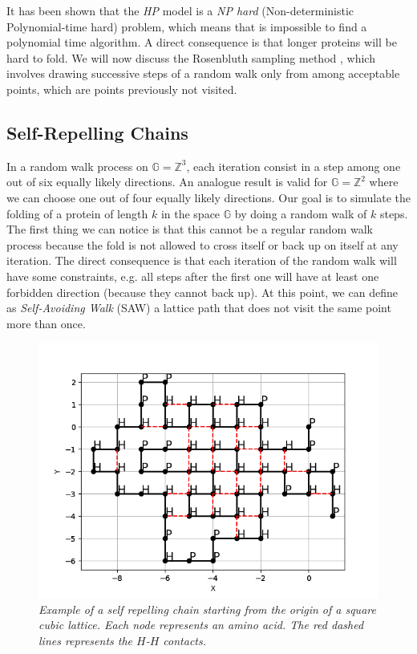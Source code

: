 It has been shown that the \emph{HP} model is a \emph{NP hard} (Non-deterministic Polynomial-time hard) problem, which means that is impossible to find a polynomial time algorithm.
A direct consequence is that longer proteins will be hard to fold.
We will now discuss the Rosenbluth sampling method \cite{PERM}, which involves drawing successive steps of a random walk only from among acceptable points, which are points previously not visited.

\subsection{Self-Repelling Chains}
In a random walk process on $\mathbb{G} = \mathbb{Z}^3$, each iteration consist in a step among one out of six equally likely directions.
An analogue result is valid for $\mathbb{G} = \mathbb{Z}^2$ where we can choose one out of four equally likely directions.
Our goal is to simulate the folding of a protein of length $k$ in the space $\mathbb{G}$ by doing a random walk of $k$ steps.
The first thing we can notice is that this cannot be a regular random walk process because the fold is not allowed to cross itself or back up on itself at any iteration.
The direct consequence is that each iteration of the random walk will have some constraints, e.g. all steps after the first one will have at least one forbidden direction (because they cannot back up).
At this point, we can define as \emph{Self-Avoiding Walk} (SAW) a lattice path that does not visit the same point more than once.
\begin{figure}[H]
    \centering
    \includegraphics[width=.6\textwidth]{./img/src_example.png}
    \caption{\emph{Example of a self repelling chain starting from the origin of a square cubic lattice.
                    Each node represents an amino acid.
                    The red dashed lines represents the $H$-$H$ contacts.}}
    \label{fig:src_example}
\end{figure}
